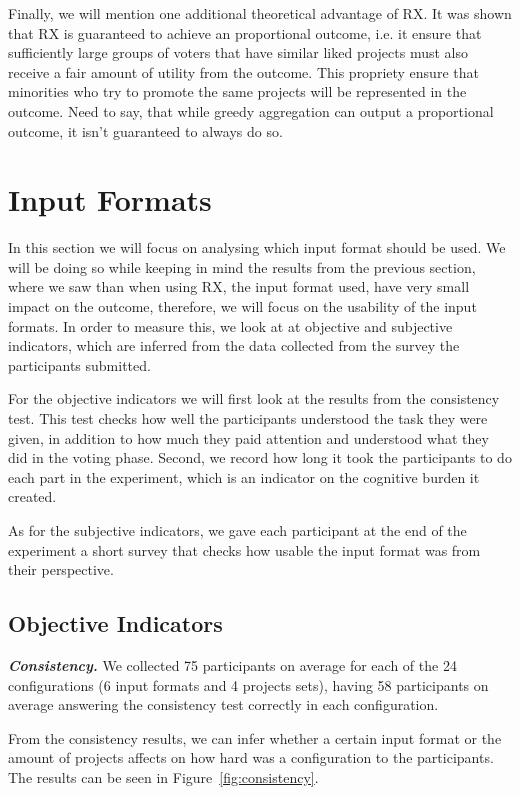 \documentclass[10pt]{article}
\begin{document}
Finally, we will mention one additional theoretical advantage of RX. It was shown \citep{peters2020proportional} that RX is guaranteed to achieve an proportional outcome, i.e. it ensure  that sufficiently large groups of voters that have similar liked projects must also receive a  fair amount of utility from the outcome. This propriety ensure that minorities who try to promote the same projects will be represented in the outcome. Need to say, that while greedy aggregation can output a proportional outcome, it isn't guaranteed to always do so. 

\section{Input Formats}
In this section we will focus on analysing which input format should be used. We will be doing so while keeping in mind the results from the previous section, where we saw than when using RX, the input format used, have very small impact on the outcome, therefore, we will focus on the usability of the input formats. In order to measure this, we look at at objective and subjective indicators, which are inferred from the data collected from the survey the participants submitted.

For the objective indicators we will first look at the results from the consistency test. This test checks how well the participants understood the task they were given, in addition to how much they paid attention and understood what they did in the voting phase.
Second, we record how long it took the participants to do each part in the experiment, which is an indicator on the cognitive burden it created.

As for the subjective indicators, we gave each participant at the end of the experiment a short survey that checks how usable the input format was from their perspective.

\subsection{Objective Indicators}
\emph{\textbf{Consistency.}} We collected 75 participants on average for each of the 24 configurations (6 input formats and 4 projects sets), having 58 participants on average answering the consistency test correctly in each configuration.

From the consistency results, we can infer whether a certain input format or the amount of projects affects on how hard was a configuration to the participants. The results can be seen in Figure~\ref{fig:consistency}.
\end{document}
